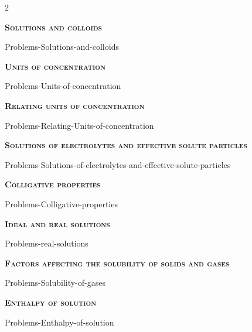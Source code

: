 \documentclass[main.tex]{subfiles}
\begin{document}
\newcommand\chapterlabel{Ch-solutions}
\newpage
{}
\fancyhfoffset[E,O]{0pt}
\setlength{\columnsep}{30pt}
\begin{conclusion}
\iftoggle{chem121}{}{
\setcounter{chapter}{2}}
\end{conclusion}
\begin{multicols*}{2}\setcounter{numA}{1}  %



%



{\raggedright\textsc{\textbf{Solutions and colloids }}\par}
{Problems-Solutions-and-colloids}
{\raggedright\textsc{\textbf{Units of concentration }}\par}
{Problems-Units-of-concentration}
{\raggedright\textsc{\textbf{Relating units of concentration }}\par}
{Problems-Relating-Units-of-concentration}

{\raggedright\textsc{\textbf{Solutions of electrolytes and effective solute particles }}\par}
{Problems-Solutions-of-electrolytes-and-effective-solute-particles}
{\raggedright\textsc{\textbf{Colligative properties }}\par}
{Problems-Colligative-properties}
{\raggedright\textsc{\textbf{Ideal and real solutions }}\par}{Problems-real-solutions}

{\raggedright\textsc{\textbf{Factors affecting the solubility of solids and gases }}\par}
{Problems-Solubility-of-gases}

{\raggedright\textsc{\textbf{Enthalpy of solution }}\par}
{Problems-Enthalpy-of-solution}


\end{multicols*}
\end{document}
